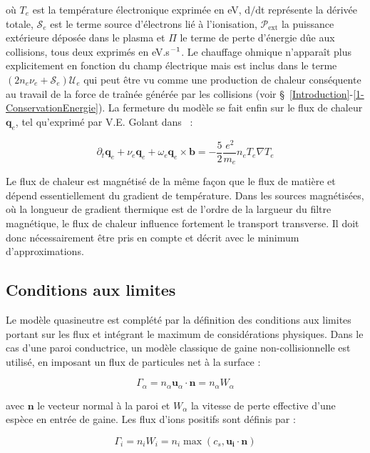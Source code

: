 \begin{refsection}
où $T_e$ est la température électronique exprimée en eV, $\text{d/dt}$
représente la dérivée totale, $\mathcal{S}_e$ est le terme source d'électrons
lié à l'ionisation, $\mathcal{P}_\text{ext}$ la puissance extérieure déposée
dans le plasma et $\Pi$ le terme de perte d'énergie dûe aux collisions, tous
deux exprimés en eV.s$^{{-1}}$.
Le chauffage ohmique n'apparaît plus explicitement en fonction du champ électrique mais est
inclus dans le terme $(2n_e\nu_e+\mathcal{S}_e)\mathcal{U}_e$ qui peut être vu
comme une production de chaleur conséquente au travail de la force de traînée générée par
les collisions (voir \S~\ref{Introduction}-\ref{1-ConservationEnergie}).
La fermeture du modèle se fait enfin sur le flux de chaleur $\mathbf{q}_e$, tel qu'exprimé par V.E. Golant
dans~\parencite{Golant} :

\begin{equation}
\partial_t \mathbf{q}_e + \nu_e\mathbf{q}_e+\omega_e\mathbf{q}_e\times\mathbf{b} =
-\frac{5}{2}\frac{e^2}{m_e}n_eT_e\nabla T_e
\end{equation}

Le flux de chaleur est magnétisé de la même façon que le flux de matière et
dépend essentiellement du gradient de température. Dans les sources magnétisées,
où la longueur de gradient thermique est de l'ordre de la largueur
du filtre magnétique, le flux de chaleur influence fortement le transport
transverse. Il doit donc nécessairement être pris en compte et décrit
avec le minimum d'approximations.

\subsection{Conditions aux limites}
Le modèle quasineutre est complété par la
définition des conditions aux limites portant sur les flux et intégrant le
maximum de considérations physiques. Dans le cas d'une paroi conductrice, un
modèle classique de gaine non-collisionnelle est utilisé, en imposant un flux
de particules net à la surface :

\begin{equation*}
	\Gamma_\alpha=n_\alpha\mathbf u_\alpha\cdot \mathbf n=n_\alpha W_\alpha
\end{equation*} 

avec $\mathbf{n}$ le vecteur normal à la paroi et $W_\alpha$ la vitesse de perte
effective d'une espèce en entrée de gaine. Les flux d'ions positifs sont définis
par :

\begin{equation}
\Gamma_i=n_iW_i=n_i\max\left(c_s,\mathbf{u_i}\cdot\mathbf{n}\right)
\end{equation}


\end{refsection}
